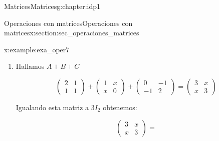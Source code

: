 \documentclass[oneside,12pt,]{book}
\newcommand{\amp}{&}
\begin{document}
\begin{chapterptx}{Matrices}{}{Matrices}{}{}{g:chapter:idp1}
\begin{sectionptx}{Operaciones con matrices}{}{Operaciones con matrices}{}{}{x:section:sec_operaciones_matrices}
\begin{example}{}{x:example:exa_oper7}
\begin{enumerate}[label=\alph*]
\begin{equation*}
\begin{pmatrix}
x^2+1 \amp x \\
x \amp x^2
\end{pmatrix}
\end{equation*}
%
\par
Igualamos las dos matrices :%
\par
%
\begin{equation*}
\begin{pmatrix}
x^2+1 \amp x \\
x \amp x^2
\end{pmatrix} =
\begin{pmatrix}
2 \amp 1 \\
1 \amp 1
\end{pmatrix}
\end{equation*}
%
\par
De aquí obtenemos el siguiente sistema de ecuaciones:%
\par
%
\begin{equation*}
\left\lbrace
\begin{array}{l}
x^2+1=2 \\
x=1 \\
x=1 \\
x^2=1
\end{array}
\right. \Rightarrow x=1 
\end{equation*}
%
\item{}Hallamos \(A+B+C\)%
\par
%
\begin{equation*}
\begin{pmatrix}
2 \amp 1 \\
1 \amp 1
\end{pmatrix} +  
\begin{pmatrix}
1 \amp x \\ 
x \amp 0
\end{pmatrix}
+\begin{pmatrix}
0 \amp -1 \\
-1 \amp 2
\end{pmatrix}=
\begin{pmatrix}
3 \amp x \\
x \amp 3
\end{pmatrix}
\end{equation*}
%
\par
Igualando esta matriz a \(3I_2\) obtenemos:%
\par
%
\begin{equation*}
\begin{pmatrix}
3 \amp x \\
x \amp 3
\end{pmatrix}=

\end{equation*}
\end{enumerate}
\end{example}
\end{sectionptx}
\end{chapterptx}
\end{document}
